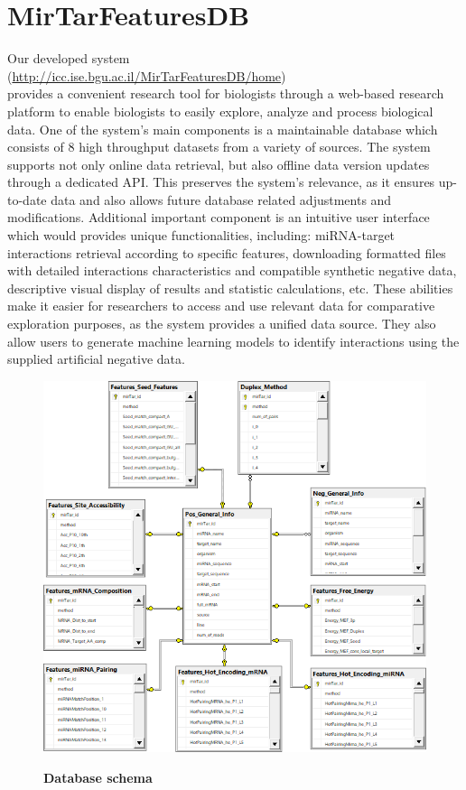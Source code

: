 \section{MirTarFeaturesDB}
Our developed system\\
(\url{http://icc.ise.bgu.ac.il/MirTarFeaturesDB/home})\\
provides a convenient research tool for biologists through a web-based research platform to enable biologists to easily explore, analyze and process biological data. One of the system's main components is a maintainable database which consists of 8 high throughput datasets from a variety of sources. The system supports not only online data retrieval, but also offline data version updates through a dedicated API. This preserves the system's relevance, as it  ensures up-to-date data and also allows future database related adjustments and modifications. Additional important component is an intuitive user interface which would provides unique functionalities, including: miRNA-target interactions retrieval according to specific features, downloading formatted files with detailed interactions characteristics and compatible synthetic negative data, descriptive visual display of results and statistic calculations, etc. These abilities make it easier for researchers to access and use relevant data for comparative exploration purposes, as the system provides a unified data source. They also allow users to generate machine learning models to identify interactions using the supplied artificial negative data.



\begin{figure}[h!]
  \caption{\textbf{Database schema}}
      \includegraphics[width = 1\textwidth]{db figures/db schema.png}
      \label{fig:dbschema}
          \end{figure}



